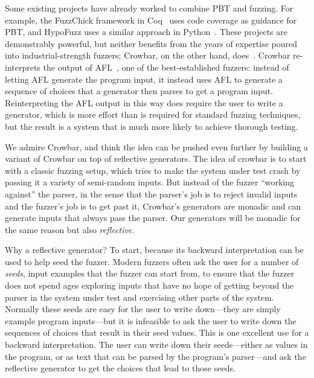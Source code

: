 Some existing projects have already worked to
combine PBT and fuzzing.
For example, the FuzzChick framework in Coq~\cite{OLDlampropoulos19fuzzchick}
uses code coverage as guidance for PBT, and HypoFuzz uses a
similar approach in Python~\cite{hatfield-dodds_hypofuzz_nodate}. These projects
are demonstrably powerful, but neither benefits from the years of expertise
poured into industrial-strength fuzzers; Crowbar, on the other hand,
does~\cite{dolan2017testing}. Crowbar re-interprets the output of
AFL~\cite{afl-readme}, one of the best-established
fuzzers: instead of letting AFL generate the program input, it instead uses AFL
to generate a sequence of choices that a generator then parses to get a program input.
Reinterpreting the AFL output in this way
does require the user to write a generator, which is more effort
than is required for
standard fuzzing techniques, but the result is a system that is much more likely
to achieve thorough testing.

We admire Crowbar, and think the idea can be pushed even further by building
a variant of Crowbar on top of reflective generators.
The idea of crowbar is to start with a classic fuzzing setup, which tries to make the
system under test
crash by passing it a variety of semi-random inputs. But instead of
the fuzzer
``working against'' the parser, in the sense that the parser's job is to reject
invalid inputs and the fuzzer's job is to get past it, Crowbar's generators are
monadic and can generate
inputs that always pass the parser. Our generators will be monadic for the same
reason but also {\em reflective}.

Why a reflective generator?
To start,
because its backward interpretation can be used to help seed the fuzzer.
Modern fuzzers often
ask the user for a number of {\em seeds}, input examples that the fuzzer can start from,
to ensure that the fuzzer does not spend ages exploring
inputs that have no hope of getting beyond the parser in the system
under test and exercising other parts of the system. Normally these seeds are easy
for the user to write down---they are simply example program inputs---but
it is infeasible to ask the user to write down the sequences of choices that
result in their seed values.
This is one excellent use for a
backward interpretation. The user can write down their seeds---either as values
in the program, or as text that can be parsed by the program's parser---and
ask the reflective generator to get the choices that lead to those seeds.

